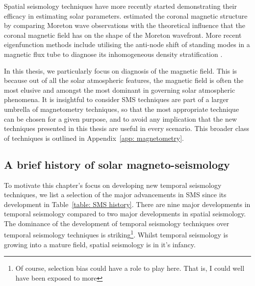 \documentclass[12pt]{../style-files/ociamthesis}
\begin{document}
Spatial seismology techniques have more recently started demonstrating their efficacy in estimating solar parameters. \cite{uch70} estimated the coronal magnetic structure by comparing Moreton wave observations with the theoretical influence that the coronal magnetic field has on the shape of the Moreton wavefront. More recent eigenfunction methods include utilising the anti-node shift of standing modes in a magnetic flux tube to diagnose its inhomogeneous density stratification \citep{erd_etal07,ver_etal07,erd_etal14}.

In this thesis, we particularly focus on diagnosis of the magnetic field. This is because out of all the solar atmospheric features, the magnetic field is often the most elusive and amongst the most dominant in governing solar atmospheric phenomena. It is insightful to consider SMS techniques are part of a larger umbrella of magnetometry techniques, so that the most appropriate technique can be chosen for a given purpose, and to avoid any implication that the new techniques presented in this thesis are useful in every scenario. This broader class of techniques is outlined in Appendix~\ref{app: magnetometry}.


\subsection{A brief history of solar magneto-seismology} \label{sec: SMS history}

To motivate this chapter's focus on developing new temporal seismology techniques, we list a selection of the major advancements in SMS since its development in Table~\ref{table: SMS history}. There are nine major developments in temporal seismology compared to two major developments in spatial seismology. The dominance of the development of temporal seismology techniques over temporal seismology techniques is striking\footnote{Of course, selection bias could have a role to play here. That is, I could well have been exposed to more }. Whilst temporal seismology is growing into a mature field, spatial seismology is in it's infancy.
\end{document}
